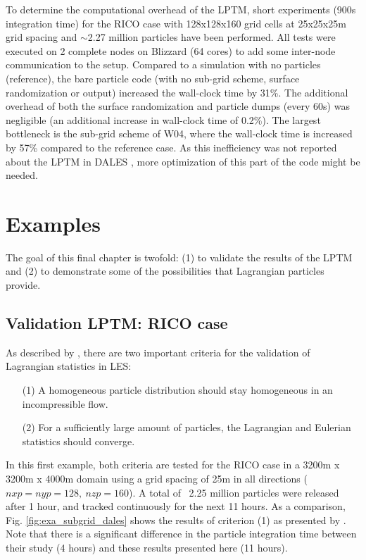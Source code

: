 \documentclass[twoside,a4paper]{report}
\begin{document}
To determine the computational overhead of the LPTM, short experiments (900s integration time) for the RICO case \citep{vanZanten2011} with 128x128x160 grid cells at 25x25x25m grid spacing and $\sim$2.27 million particles have been performed. All tests were executed on 2 complete nodes on Blizzard (64 cores) to add some inter-node communication to the setup. Compared to a simulation with no particles (reference), the bare particle code (with no sub-grid scheme, surface randomization or output) increased the wall-clock time by 31\%. The additional overhead of both the surface randomization and particle dumps (every 60s) was negligible (an additional increase in wall-clock time of 0.2\%). The largest bottleneck is the sub-grid scheme of W04, where the wall-clock time is increased by 57\% compared to the reference case. As this inefficiency was not reported about the LPTM in DALES \citep{heus2010}, more optimization of this part of the code might be needed.   

\chapter{Examples}
\label{chap:examples}

The goal of this final chapter is twofold: (1) to validate the results of the LPTM and (2) to demonstrate some of the possibilities that Lagrangian particles provide.

\section{Validation LPTM: RICO case}

As described by \cite{heus2008}, there are two important criteria for the validation of Lagrangian statistics in LES:

\begin{enumerate}
 \item[(1)] A homogeneous particle distribution should stay homogeneous in an incompressible flow.
 \item[(2)] For a sufficiently large amount of particles, the Lagrangian and Eulerian statistics should converge.
\end{enumerate}

In this first example, both criteria are tested for the RICO case \citep{vanZanten2011} in a 3200m x 3200m x 4000m domain using a grid spacing of 25m in all directions ($nxp = nyp = 128, \: nzp = 160$). A total of ~2.25 million particles were released after 1 hour, and tracked continuously for the next 11 hours. As a comparison, Fig. \ref{fig:exa_subgrid_dales} shows the results of criterion (1) as presented by \cite{heus2008}. Note that there is a significant difference in the particle integration time between their study (4 hours) and these results presented here (11 hours).\newline
\end{document}
